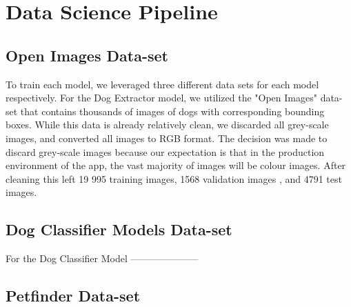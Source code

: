 \documentclass{article}
\begin{document}
\section{Data Science Pipeline}

\subsection{Open Images Data-set}

To train each model, we leveraged three different data sets for each model respectively.  For the Dog Extractor model, we utilized the "Open Images" \cite{openimages} data-set that contains thousands of images of dogs with corresponding bounding boxes.  While this data is already relatively clean, we discarded all grey-scale images, and converted all images to RGB format.  The decision was made to discard grey-scale images because our expectation is that in the production environment of the app, the vast majority of images will be colour images.  After cleaning this left 19 995 training images, 1568 validation images , and 4791 test images.

\subsection{Dog Classifier Models Data-set}

For the Dog Classifier Model ---------------------

\subsection{Petfinder Data-set}
\end{document}
